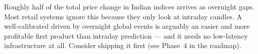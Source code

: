 \begin{keybox}[title={The overnight opportunity}]
Roughly half of the total price change in Indian indices arrives as overnight
gaps. Most retail systems ignore this because they only look at intraday
candles. A well-calibrated  driven by overnight global
events is arguably an easier and more profitable first product than intraday
prediction --- and it needs no low-latency infrastructure at all. Consider
shipping it first (see Phase~4 in the roadmap).
\end{keybox}
